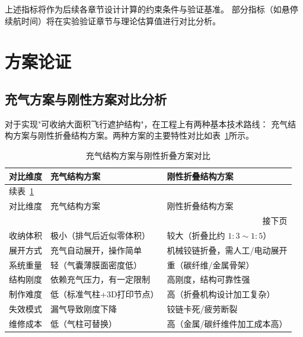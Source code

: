 上述指标将作为后续各章节设计计算的约束条件与验证基准。
部分指标（如悬停续航时间）将在实验验证章节与理论估算值进行对比分析。


\section{方案论证}

\subsection{充气方案与刚性方案对比分析}

对于实现"可收纳大面积飞行遮护结构"，在工程上有两种基本技术路线：
充气结构方案与刚性折叠结构方案。两种方案的主要特性对比如表~\ref{tab:scheme_compare}所示。

\begin{longtable}{lll}
    \caption{充气结构方案与刚性折叠方案对比}
    \label{tab:scheme_compare} \\

    \toprule
    对比维度 & 充气结构方案 & 刚性折叠结构方案 \\
    \midrule
    \endfirsthead

    \multicolumn{3}{l}{\small 续表~\ref*{tab:scheme_compare}} \\[2pt]
    \toprule
    对比维度 & 充气结构方案 & 刚性折叠结构方案 \\
    \midrule
    \endhead

    \midrule
    \multicolumn{3}{r}{\small 接下页} \\
    \endfoot

    \bottomrule
    \endlastfoot

    收纳体积 & 极小（排气后近似零体积）         & 较大（折叠比约 $1:3\sim1:5$） \\[3pt]
    展开方式 & 充气自动展开，操作简单            & 机械铰链折叠，需人工/电动展开 \\[3pt]
    系统重量 & 轻（气囊薄膜面密度低）            & 重（碳纤维/金属骨架） \\[3pt]
    结构刚度 & 依赖充气压力，有一定限制          & 高刚度，结构可靠性强 \\[3pt]
    制作难度 & 低（标准气柱+3D打印节点）         & 高（折叠机构设计加工复杂） \\[3pt]
    失效模式 & 漏气导致刚度下降                  & 铰链卡死/疲劳断裂 \\[3pt]
    维修成本 & 低（气柱可替换）                  & 高（金属/碳纤维件加工成本高） \\

\end{longtable}

